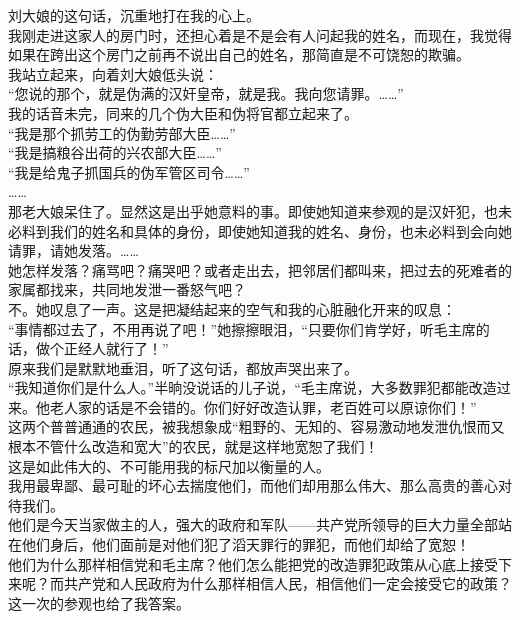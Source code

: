 刘大娘的这句话，沉重地打在我的心上。\\

我刚走进这家人的房门时，还担心着是不是会有人问起我的姓名，而现在，我觉得如果在跨出这个房门之前再不说出自己的姓名，那简直是不可饶恕的欺骗。\\

我站立起来，向着刘大娘低头说：\\

“您说的那个，就是伪满的汉奸皇帝，就是我。我向您请罪。……”\\

我的话音未完，同来的几个伪大臣和伪将官都立起来了。\\

“我是那个抓劳工的伪勤劳部大臣……”\\

“我是搞粮谷出荷的兴农部大臣……”\\

“我是给鬼子抓国兵的伪军管区司令……”\\

……\\

那老大娘呆住了。显然这是出乎她意料的事。即使她知道来参观的是汉奸犯，也未必料到我们的姓名和具体的身份，即使她知道我的姓名、身份，也未必料到会向她请罪，请她发落。……\\

她怎样发落？痛骂吧？痛哭吧？或者走出去，把邻居们都叫来，把过去的死难者的家属都找来，共同地发泄一番怒气吧？\\

不。她叹息了一声。这是把凝结起来的空气和我的心脏融化开来的叹息：\\

“事情都过去了，不用再说了吧！”她擦擦眼泪，“只要你们肯学好，听毛主席的话，做个正经人就行了！”\\

原来我们是默默地垂泪，听了这句话，都放声哭出来了。\\

“我知道你们是什么人。”半晌没说话的儿子说，“毛主席说，大多数罪犯都能改造过来。他老人家的话是不会错的。你们好好改造认罪，老百姓可以原谅你们！”\\

这两个普普通通的农民，被我想象成“粗野的、无知的、容易激动地发泄仇恨而又根本不管什么改造和宽大”的农民，就是这样地宽恕了我们！\\

这是如此伟大的、不可能用我的标尺加以衡量的人。\\

我用最卑鄙、最可耻的坏心去揣度他们，而他们却用那么伟大、那么高贵的善心对待我们。\\

他们是今天当家做主的人，强大的政府和军队——共产党所领导的巨大力量全部站在他们身后，他们面前是对他们犯了滔天罪行的罪犯，而他们却给了宽恕！\\

他们为什么那样相信党和毛主席？他们怎么能把党的改造罪犯政策从心底上接受下来呢？而共产党和人民政府为什么那样相信人民，相信他们一定会接受它的政策？\\

这一次的参观也给了我答案。
